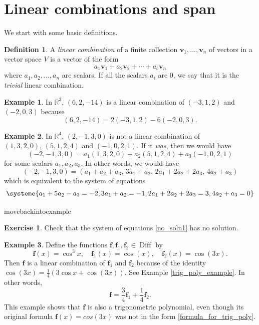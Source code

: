 \documentclass[a4paper,11pt]{book}
\theoremstyle{definition}
\newtheorem{definition}[theorem]{Definition}
\newtheorem{exercise}{Exercise}
\newtheorem{example_environment}{Example}[chapter]
\newcommand{\be}{\begin{equation}}
\newcommand{\ee}{\end{equation}}
\newcommand{\ve}[1]{\mathbf{#1}}
\newenvironment{example}
	{
		\begin{oframed} 
		\begin{example_environment}
	}
	{
		\end{example_environment}
		\end{oframed}
	}
\DeclareMathOperator{\Diff}{Diff}
\begin{document}
\section{Linear combinations and span} \label{Ch2Sec1LinearCombinationSpan}
We start with some basic definitions.
\begin{definition} A {\em linear combination} of a finite collection $\ve{v}_1, \ldots, \ve{v}_n$ of vectors in a vector space $V$ is a vector of the form
\be
 a_1 \ve{v}_1 + a_2 \ve{v}_2 + \cdots + a_b \ve{v}_n
\ee
where $a_1, a_2, \ldots, a_n$ are scalars. If all the scalars $a_i$ are $0$, we say that it is the {\em trivial} linear combination.
\end{definition}
\begin{example} In $\mathbb{R}^3$, $(6, 2, -14)$ is a linear combination of $(-3, 1, 2)$ and $(-2, 0, 3)$ because
\[
(6, 2, -14) = 2 (-3, 1, 2) -6 (-2, 0, 3).
\]
\end{example}
\begin{example} In $\mathbb{R}^4$, $(2, -1, 3, 0)$ is not a linear combination of $(1, 3, 2, 0), \, (5, 1, 2, 4)$ and $(-1, 0, 2, 1)$. If it {\em was}, then we would have 
\[
 (-2, -1, 3, 0) = a_1 (1, 3, 2, 0) + a_2 (5, 1, 2, 4) + a_3 (-1, 0, 2, 1)
\]
for some scalars $a_1, a_2, a_3$. In other words, we would have
\[
 (-2, -1, 3, 0) = (a_1 + a_2 + a_3, \, 3a_1 + a_2, \, 2a_1 + 2a_2 + 2a_3, \, 4a_2 + a_3)
\]
which is equivalent to the system of equations
\be \label{no_soln1}
\systeme{a_1 + 5a_2 -a_3 = -2, 3a_1 + a_2 = -1, 2a_1 + 2a_2 + 2a_3 = 3, 4a_2 + a_3 = 0}
\ee

\end{example}
movebackintoexample
\begin{exercise} Check that the system of equations \eqref{no_soln1} has no solution.
\end{exercise}
\begin{example} Define the functions $\ve{f}, \ve{f}_1, \ve{f}_2 \in \Diff$ by
\[
 \ve{f}(x) = \cos^3 x, \quad \ve{f}_1 (x) = \cos (x), \quad \ve{f}_2 (x) = \cos (3x).
 \]
Then $\ve{f}$ is a linear combination of $\ve{f}_1$ and $\ve{f}_2$ because of the identity $\cos(3x) = \frac{1}{4} (3 \cos x  + \cos(3x))$. See Example \ref{trig_poly_example}. In other words,
\[
  \ve{f} = \frac{3}{4} \ve{f}_1 + \frac{1}{4} \ve{f}_2 .
\]
This example shows that $\ve{f}$ is also a trigonometric polynomial, even though its original formula $\ve{f}(x) = cos(3x)$ was not in the form \eqref{formula_for_trig_poly}. 
\end{example}
\end{document}

